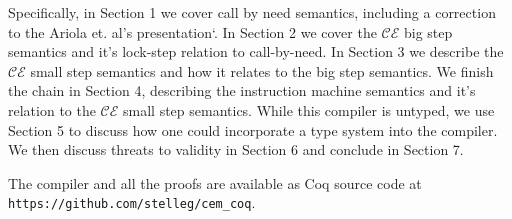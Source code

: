 Specifically, in Section 1 we cover call by need semantics, including a
correction to the Ariola et. al's presentation`\cite{ariola1995call}. In Section
2 we cover the $\mathcal{CE}$ big step semantics and it's lock-step relation to
call-by-need.  In Section 3 we describe the $\mathcal{CE}$ small step semantics
and how it relates to the big step semantics. We finish the chain in Section 4,
describing the instruction machine semantics and it's relation to the
$\mathcal{CE}$ small step semantics. While this compiler is untyped, we use
Section 5 to discuss how one could incorporate a type system into the compiler.
We then discuss threats to validity in Section 6 and conclude in Section 7. 

The compiler and all the proofs are available as Coq source code at
\texttt{https://github.com/stelleg/cem\_coq}.


